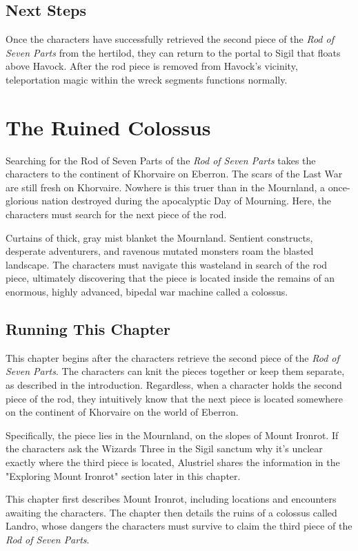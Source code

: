 \documentclass[10pt,a4paper,twoside,bg=print,twocolumn,openany,nodeprecatedcode]{dndbook}
\begin{document}
\section{Next Steps}
Once the characters have successfully retrieved the second piece of the \textit{Rod of Seven Parts} from the hertilod, they can return to the portal to Sigil that floats above Havock. After the rod piece is removed from Havock's vicinity, teleportation magic within the wreck segments functions normally.

\chapter{The Ruined Colossus}
Searching for the Rod of Seven Parts of the \textit{Rod of Seven Parts} takes the characters to the continent of Khorvaire on Eberron. The scars of the Last War are still fresh on Khorvaire. Nowhere is this truer than in the Mournland, a once-glorious nation destroyed during the apocalyptic Day of Mourning. Here, the characters must search for the next piece of the rod.

Curtains of thick, gray mist blanket the Mournland. Sentient constructs, desperate adventurers, and ravenous mutated monsters roam the blasted landscape. The characters must navigate this wasteland in search of the rod piece, ultimately discovering that the piece is located inside the remains of an enormous, highly advanced, bipedal war machine called a colossus.

\section{Running This Chapter}
This chapter begins after the characters retrieve the second piece of the \textit{Rod of Seven Parts}. The characters can knit the pieces together or keep them separate, as described in the introduction. Regardless, when a character holds the second piece of the rod, they intuitively know that the next piece is located somewhere on the continent of Khorvaire on the world of Eberron.

Specifically, the piece lies in the Mournland, on the slopes of Mount Ironrot. If the characters ask the Wizards Three in the Sigil sanctum why it's unclear exactly where the third piece is located, Alustriel shares the information in the "Exploring Mount Ironrot" section later in this chapter.

This chapter first describes Mount Ironrot, including locations and encounters awaiting the characters. The chapter then details the ruins of a colossus called Landro, whose dangers the characters must survive to claim the third piece of the \textit{Rod of Seven Parts}.
\end{document}
